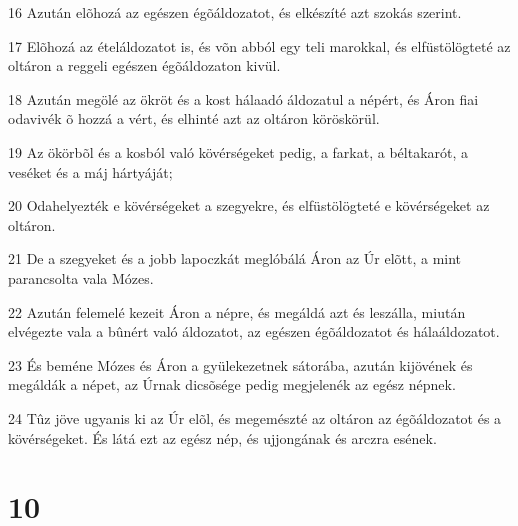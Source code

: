 \par 16 Azután elõhozá az egészen égõáldozatot, és elkészíté azt szokás szerint.
\par 17 Elõhozá az ételáldozatot is, és võn abból egy teli marokkal, és elfüstölögteté az oltáron a reggeli egészen égõáldozaton kivül.
\par 18 Azután megölé az ökröt és a kost hálaadó áldozatul a népért, és Áron fiai odavivék õ hozzá a vért, és elhinté azt az oltáron köröskörül.
\par 19 Az ökörbõl és a kosból való kövérségeket pedig, a farkat, a béltakarót, a veséket és a máj hártyáját;
\par 20 Odahelyezték e kövérségeket a szegyekre, és elfüstölögteté e kövérségeket az oltáron.
\par 21 De a szegyeket és a jobb lapoczkát meglóbálá Áron az Úr elõtt, a mint parancsolta vala Mózes.
\par 22 Azután felemelé kezeit Áron a népre, és megáldá azt és leszálla, miután elvégezte vala a bûnért való áldozatot, az egészen égõáldozatot és hálaáldozatot.
\par 23 És beméne Mózes és Áron a gyülekezetnek sátorába, azután kijövének és megáldák a népet, az Úrnak dicsõsége pedig megjelenék az egész népnek.
\par 24 Tûz jöve ugyanis ki az Úr elõl, és megemészté az oltáron az égõáldozatot és a kövérségeket. És látá ezt az egész nép, és ujjongának és arczra esének.

\chapter{10}

